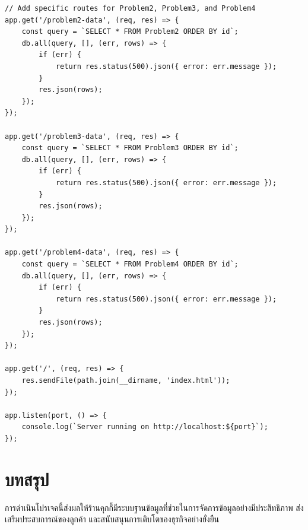 \documentclass{report}
\begin{document}
\begin{verbatim}
// Add specific routes for Problem2, Problem3, and Problem4
app.get('/problem2-data', (req, res) => {
    const query = `SELECT * FROM Problem2 ORDER BY id`;
    db.all(query, [], (err, rows) => {
        if (err) {
            return res.status(500).json({ error: err.message });
        }
        res.json(rows);
    });
});
 
app.get('/problem3-data', (req, res) => {
    const query = `SELECT * FROM Problem3 ORDER BY id`;
    db.all(query, [], (err, rows) => {
        if (err) {
            return res.status(500).json({ error: err.message });
        }
        res.json(rows);
    });
});
 
app.get('/problem4-data', (req, res) => {
    const query = `SELECT * FROM Problem4 ORDER BY id`;
    db.all(query, [], (err, rows) => {
        if (err) {
            return res.status(500).json({ error: err.message });
        }
        res.json(rows);
    });
});
 
app.get('/', (req, res) => {
    res.sendFile(path.join(__dirname, 'index.html'));
});
 
app.listen(port, () => {
    console.log(`Server running on http://localhost:${port}`);
});
\end{verbatim}

\chapter{บทสรุป}
การดําเนินโปรเจคนี้ส่งผลให้ร้านคุกกี้มีระบบฐานข้อมูลที่ช่วยในการจัดการข้อมูลอย่างมีประสิทธิภาพ ส่งเสริมประสบการณ์ของลูกค้า และสนับสนุนการเติบโตของธุรกิจอย่างยั่งยืน

\printbibliography
\end{document}
